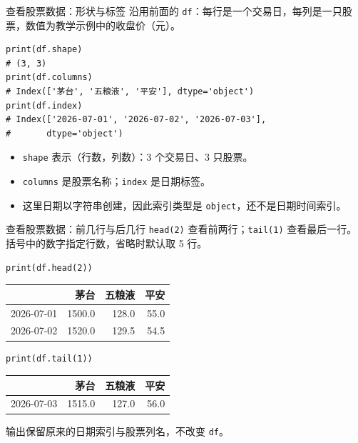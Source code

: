 \documentclass[9pt]{ctexbeamer}
\begin{document}
\begin{frame}[fragile]{查看股票数据：形状与标签}
\small 沿用前面的 \texttt{df}：每行是一个交易日，每列是一只股票，数值为教学示例中的收盘价（元）。
\begin{lstlisting}
print(df.shape)
# (3, 3)
print(df.columns)
# Index(['茅台', '五粮液', '平安'], dtype='object')
print(df.index)
# Index(['2026-07-01', '2026-07-02', '2026-07-03'],
#       dtype='object')
\end{lstlisting}
\begin{itemize}
\item \texttt{shape} 表示（行数，列数）：3 个交易日、3 只股票。
\item \texttt{columns} 是股票名称；\texttt{index} 是日期标签。
\item 这里日期以字符串创建，因此索引类型是 \texttt{object}，还不是日期时间索引。
\end{itemize}
\end{frame}

\begin{frame}[fragile]{查看股票数据：前几行与后几行}
\small \texttt{head(2)} 查看前两行；\texttt{tail(1)} 查看最后一行。括号中的数字指定行数，省略时默认取 5 行。
\begin{lstlisting}
print(df.head(2))
\end{lstlisting}
\begin{center}
\begin{tabular}{lrrr}
\toprule
 & 茅台 & 五粮液 & 平安 \\
\midrule
2026-07-01 & 1500.0 & 128.0 & 55.0 \\
2026-07-02 & 1520.0 & 129.5 & 54.5 \\
\bottomrule
\end{tabular}
\end{center}
\begin{lstlisting}
print(df.tail(1))
\end{lstlisting}
\begin{center}
\begin{tabular}{lrrr}
\toprule
 & 茅台 & 五粮液 & 平安 \\
\midrule
2026-07-03 & 1515.0 & 127.0 & 56.0 \\
\bottomrule
\end{tabular}
\end{center}
输出保留原来的日期索引与股票列名，不改变 \texttt{df}。
\end{frame}
\end{document}
